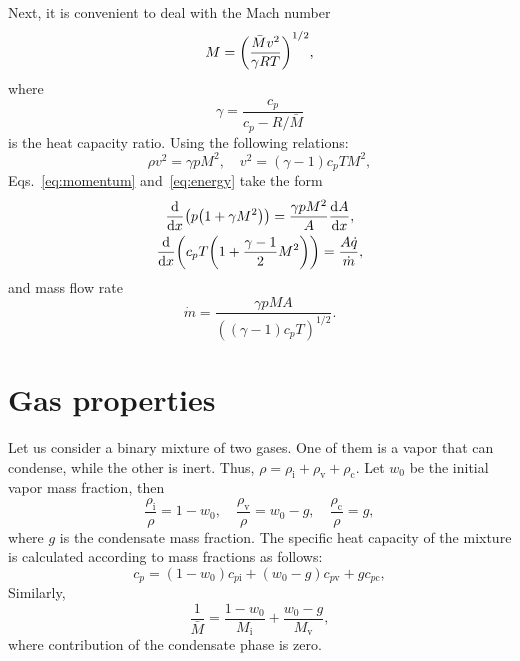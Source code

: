 \documentclass{article}
\newcommand{\vap}{\text{v}}
\newcommand{\ine}{\text{i}}
\newcommand{\con}{\text{c}}
\begin{document}
Next, it is convenient to deal with the Mach number
\begin{equation}\label{eq:Mach}
    M = \qty(\frac{\bar{M}v^2}{\gamma RT})^{1/2},
\end{equation}
where
\begin{equation}\label{eq:gamma}
    \gamma = \frac{c_p}{c_p - R/\bar{M}}
\end{equation}
is the heat capacity ratio.
Using the following relations:
\begin{equation*}
    \rho v^2 = \gamma p M^2, \quad v^2 = (\gamma-1)c_pT M^2,
\end{equation*}
Eqs.~\eqref{eq:momentum} and~\eqref{eq:energy} take the form
\begin{gather}
    \dv{x}(p\qty(1 + \gamma M^2)) = \frac{\gamma p M^2}{A}\dv{A}{x}, \label{eq:momentum2}\\
    \dv{x}(c_pT\qty(1 + \frac{\gamma-1}{2}M^2)) = \frac{A\dot{q}}{\dot{m}}, \label{eq:energy2}
\end{gather}
and mass flow rate
\begin{equation}\label{eq:dotm}
    \dot{m} = \frac{\gamma pMA}{((\gamma-1)c_pT)^{1/2}}.
\end{equation}

\section{Gas properties}

Let us consider a binary mixture of two gases.
One of them is a vapor that can condense, while the other is inert.
Thus, $\rho = \rho_\ine + \rho_\vap + \rho_\con$.
Let $w_0$ be the initial vapor mass fraction, then
\begin{equation}\label{eq:rhoM}
    \frac{\rho_\ine}{\rho} = 1-w_0, \quad \frac{\rho_\vap}{\rho} = w_0-g, \quad \frac{\rho_\con}{\rho} = g,
\end{equation}
where $g$ is the condensate mass fraction.
The specific heat capacity of the mixture is calculated according to mass fractions as follows:
\begin{equation}\label{eq:c_p}
    c_p = (1-w_0)c_{p\ine} + (w_0-g)c_{p\vap} + gc_{p\con},
\end{equation}
Similarly,
\begin{equation}\label{eq:M}
    \frac1{\bar{M}} = \frac{1-w_0}{M_\ine} + \frac{w_0-g}{M_\vap},
\end{equation}
where contribution of the condensate phase is zero.
\end{document}
